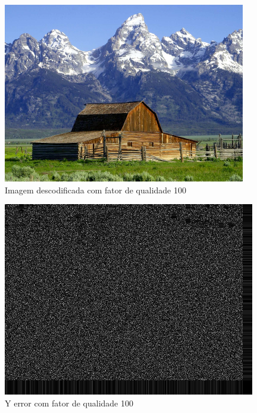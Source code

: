 \documentclass[a4paper, 12pt]{article}
\begin{document}
        \begin{multicols}{2}
            \begin{figure}[H]
                \includegraphics[width=\linewidth]{resources/DIFFS/Descodification_quality_100.png}
                \caption{\label{fig:my_label} Imagem descodificada com fator de qualidade 100}
            \end{figure}
            \begin{figure}[H]
                \includegraphics[width=\linewidth]{resources/DIFFS/Diff_Image_with_quality_100.png}
                \caption{\label{fig:my_label} Y error com fator de qualidade 100}
            \end{figure}
        \end{multicols}
\end{document}
